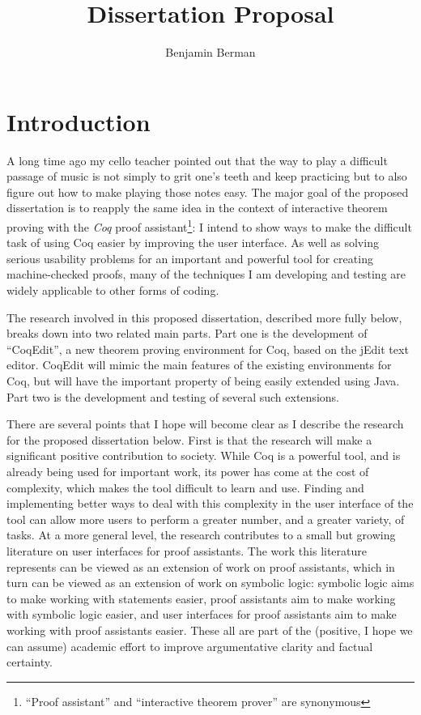\documentclass[11pt]{amsart}
\title{Dissertation Proposal}
\author{Benjamin Berman}
\begin{document}
\maketitle
\section{Introduction}

A long time ago my cello teacher pointed out that the way to play a difficult passage of music is not simply to grit one's teeth and keep practicing but to also figure out how to make playing those notes easy.  The major goal of the proposed dissertation is to reapply the same idea in the context of interactive theorem proving with the \textit{Coq} proof assistant\cite{Coq}\footnote{``Proof assistant'' and ``interactive theorem prover'' are synonymous}:  I intend to show ways to make the difficult task of using Coq easier by improving the user interface.  As well as solving serious usability problems for an important and powerful tool for creating machine-checked proofs, many of the techniques I am developing and testing are widely applicable to other forms of coding.

The research involved in this proposed dissertation, described more fully below, breaks down into two related main parts.  Part one is the development of ``CoqEdit'', a new theorem proving environment for Coq, based on the jEdit text editor.  CoqEdit will mimic the main features of the existing environments for Coq, but will have the important property of being easily extended using Java.  Part two is the development and testing of several such extensions.

There are several points that I hope will become clear as I describe the research for the proposed dissertation below.  First is that the research will make a significant positive contribution to society.  While Coq is a powerful tool, and is already being used for important work, its power has come at the cost of complexity, which makes the tool difficult to learn and use.  Finding and implementing better ways to deal with this complexity in the user interface of the tool can allow more users to perform a greater number, and a greater variety, of tasks.  At a more general level, the research contributes to a small but growing literature on user interfaces for proof assistants.  The work this literature represents can be viewed as an extension of work on proof assistants, which in turn can be viewed as an extension of work on symbolic logic:  symbolic logic aims to make working with statements easier, proof assistants aim to make working with symbolic logic easier, and user interfaces for proof assistants aim to make working with proof assistants easier.  These all are part of the (positive, I hope we can assume) academic effort to improve argumentative clarity and factual certainty.  
	
\end{document}
